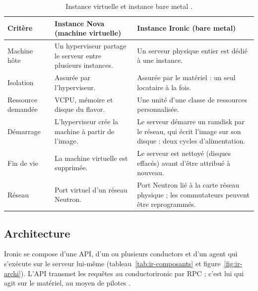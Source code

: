 \begin{table}[!ht]
\centering
\renewcommand{\arraystretch}{1.3}
\begin{tabular}{@{}>{\raggedright\arraybackslash}p{2.8cm}>{\raggedright\arraybackslash}p{5.9cm}>{\raggedright\arraybackslash}p{6.8cm}@{}}
\toprule
\textbf{Critère} & \textbf{Instance Nova (machine virtuelle)} & \textbf{Instance Ironic (bare metal)} \\
\midrule
Machine hôte & Un hyperviseur partage le serveur entre plusieurs instances. & Un serveur physique entier est dédié à une instance. \\
Isolation & Assurée par l'hyperviseur. & Assurée par le matériel : un seul locataire à la fois. \\
Ressource demandée & VCPU, mémoire et disque du flavor. & Une unité d'une classe de ressources personnalisée. \\
Démarrage & L'hyperviseur crée la machine à partir de l'image. & Le serveur démarre un ramdisk par le réseau, qui écrit l'image sur son disque : deux cycles d'alimentation. \\
Fin de vie & La machine virtuelle est supprimée. & Le serveur est nettoyé (disques effacés) avant d'être attribué à nouveau. \\
Réseau & Port virtuel d'un réseau Neutron. & Port Neutron lié à la carte réseau physique ; les commutateurs peuvent être reprogrammés. \\
\bottomrule
\end{tabular}
\caption{Instance virtuelle et instance bare metal \parencite{ironic-overview,ironic-nova-flavors,ironic-networking}.}
\label{tab:ir-vm}
\end{table}

\subsection{Architecture}\label{sec:ir-archi}

Ironic se compose d'une API, d'un ou plusieurs conductors et d'un agent qui s'exécute sur le serveur lui-même
(tableau~\ref{tab:ir-composants} et figure~\ref{fig:ir-archi}). L'API transmet les requêtes au \gls{conductorironic} par RPC ;
c'est lui qui agit sur le matériel, au moyen de pilotes \parencite{ironic-overview}.

